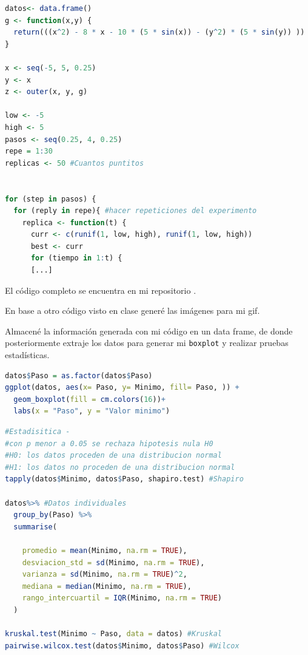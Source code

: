 \documentclass{article}
\begin{document}
\begin{lstlisting}[language=R, caption= C\'odigo para obtener los puntos.]
datos<- data.frame()
g <- function(x,y) {
  return(((x^2) - 8 * x - 10 * (5 * sin(x)) - (y^2) * (5 * sin(y)) ))
}

x <- seq(-5, 5, 0.25) 
y <- x
z <- outer(x, y, g)

low <- -5
high <- 5
pasos <- seq(0.25, 4, 0.25) 
repe = 1:30
replicas <- 50 #Cuantos puntitos


for (step in pasos) {
  for (reply in repe){ #hacer repeticiones del experimento
    replica <- function(t) {
      curr <- c(runif(1, low, high), runif(1, low, high))
      best <- curr
      for (tiempo in 1:t) {
      [...]
\end{lstlisting}

\newpage El c\'odigo completo se encuentra en mi repositorio\citep{Ccompleto} .

En base a otro c\'odigo visto en clase\citep{Cimagenes} gener\'e las im\'agenes para mi gif\citep{Gif}.

Almacen\'e la informaci\'on generada con mi c\'odigo en un data frame, de donde posteriormente extraje los datos para generar mi \texttt{boxplot} y realizar pruebas estad\'isticas.

\begin{lstlisting}[language=R, caption= C\'odigo Boxplot.]
datos$Paso = as.factor(datos$Paso)
ggplot(datos, aes(x= Paso, y= Minimo, fill= Paso, )) + 
  geom_boxplot(fill = cm.colors(16))+
  labs(x = "Paso", y = "Valor minimo")
\end{lstlisting}



\begin{lstlisting}[language=R, caption= C\'odigo pruebas estad\'isticas.]
#Estadisitica - 
#con p menor a 0.05 se rechaza hipotesis nula H0
#H0: los datos proceden de una distribucion normal
#H1: los datos no proceden de una distribucion normal
tapply(datos$Minimo, datos$Paso, shapiro.test) #Shapiro

datos%>% #Datos individuales
  group_by(Paso) %>%
  summarise(
    
    promedio = mean(Minimo, na.rm = TRUE),
    desviacion_std = sd(Minimo, na.rm = TRUE),
    varianza = sd(Minimo, na.rm = TRUE)^2,
    mediana = median(Minimo, na.rm = TRUE),
    rango_intercuartil = IQR(Minimo, na.rm = TRUE)
  )

kruskal.test(Minimo ~ Paso, data = datos) #Kruskal
pairwise.wilcox.test(datos$Minimo, datos$Paso) #Wilcox
\end{lstlisting}
\end{document}
